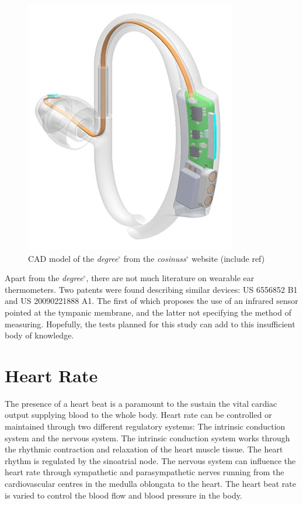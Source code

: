 \begin{figure}[h]
   \centering
   \includegraphics[scale=0.65]{figs/Degree}
   \caption{CAD model of the \textit{degree}$^{\circ}$ from the \textit{cosinuss}$^{\circ}$ website (include ref)}
   \label{fig:Degree}
\end{figure}

Apart from the \textit{degree}$^{\circ}$, there are not much literature on wearable ear thermometers. Two patents were found describing similar devices: US 6556852 B1 and US 20090221888 A1. The first of which proposes the use of an infrared sensor pointed at the tympanic membrane, and the latter not specifying the method of measuring. Hopefully, the tests planned for this study can add to this insufficient body of knowledge.

\section{Heart Rate}
The presence of a heart beat is a paramount to the sustain the vital cardiac output supplying blood to the whole body. Heart  rate can be controlled or maintained through two different regulatory systems: The intrinsic conduction system and the nervous system. The intrinsic conduction system works through the rhythmic contraction and relaxation of the heart muscle tissue. The heart rhythm is regulated by the sinoatrial node. The nervous system can influence the heart rate through sympathetic and parasympathetic nerves running from the cardiovascular centres in the medulla oblongata to the heart. The heart beat rate is varied to control the blood flow and blood pressure in the body.

